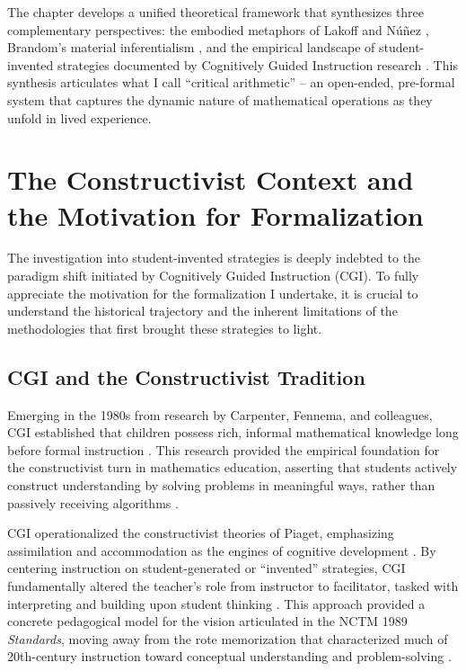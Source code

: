\documentclass[12pt]{book}
\begin{document}
The chapter develops a unified theoretical framework that synthesizes three complementary perspectives: the embodied metaphors of Lakoff and Núñez \parencite{Lakoff2000}, Brandom's material inferentialism \parencite{Brandom2008}, and the empirical landscape of student-invented strategies documented by Cognitively Guided Instruction research \parencite{Carpenter1999}. This synthesis articulates what I call ``critical arithmetic'' -- an open-ended, pre-formal system that captures the dynamic nature of mathematical operations as they unfold in lived experience.

\section{The Constructivist Context and the Motivation for Formalization}

The investigation into student-invented strategies is deeply indebted to the paradigm shift initiated by Cognitively Guided Instruction (CGI). To fully appreciate the motivation for the formalization I undertake, it is crucial to understand the historical trajectory and the inherent limitations of the methodologies that first brought these strategies to light.

\subsection{CGI and the Constructivist Tradition}

Emerging in the 1980s from research by Carpenter, Fennema, and colleagues, CGI established that children possess rich, informal mathematical knowledge long before formal instruction \parencite{WCER_CGI_Ingenuity}. This research provided the empirical foundation for the constructivist turn in mathematics education, asserting that students actively construct understanding by solving problems in meaningful ways, rather than passively receiving algorithms \parencite{NU_Constructivism_Education}.

CGI operationalized the constructivist theories of Piaget, emphasizing assimilation and accommodation as the engines of cognitive development \parencite{UBuffalo_Constructivism}. By centering instruction on student-generated or ``invented'' strategies, CGI fundamentally altered the teacher's role from instructor to facilitator, tasked with interpreting and building upon student thinking \parencite{WCER_CGI_Ingenuity}. This approach provided a concrete pedagogical model for the vision articulated in the NCTM 1989 \textit{Standards}, moving away from the rote memorization that characterized much of 20th-century instruction toward conceptual understanding and problem-solving \parencite{Purdue_Dewey_NCTM}.
\end{document}
